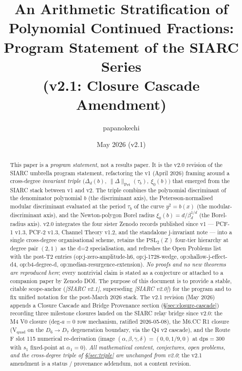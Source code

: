 \documentclass[11pt,a4paper]{article}
\title{An Arithmetic Stratification of Polynomial Continued Fractions:\\
       Program Statement of the SIARC Series\\
       \large (v2.1: Closure Cascade Amendment)}
\author{papanokechi}
\date{May 2026 (v2.1)}
\theoremstyle{definition}
\theoremstyle{remark}
\newcommand{\PSLZ}{\mathrm{PSL}_2(\mathbb{Z})}
\newcommand{\PetN}[1]{\lVert #1 \rVert_{\mathrm{Pet}}}
\begin{document}
\maketitle

\begin{abstract}
This paper is a \emph{program statement}, not a results paper. It is the
v2.0 revision of the SIARC umbrella program statement, refactoring the
v1 (April 2026) framing around a cross-degree \emph{invariant triple}
\(\bigl(\Delta_d(b),\ \PetN{\Delta}(\tau_b),\ \xi_0(b)\bigr)\) that
emerged from the SIARC stack between v1 and v2. The triple combines
the polynomial discriminant of the denominator polynomial \(b\) (the
discriminant axis), the Petersson-normalised modular discriminant
evaluated at the period \(\tau_b\) of the curve \(y^2 = b(x)\) (the
modular-discriminant axis), and the Newton-polygon Borel radius
\(\xi_0(b) = d/\beta_d^{1/d}\) (the Borel-radius axis). v2.0 integrates
the four sister Zenodo records published since v1 --- PCF-1 v1.3,
PCF-2 v1.3, Channel Theory v1.2, and the standalone j-invariant
note --- into a single cross-degree organisational scheme, retains the
$\PSLZ$ four-tier hierarchy at degree pair \((2,1)\) as the d=2
specialisation, and refreshes the Open Problems list with the
post-T2 entries (\textsf{op:j-zero-amplitude-h6},
\textsf{op:j-1728-wedge}, \textsf{op:shallow-j-effect-d4},
\textsf{op:b4-degree-d}, \textsf{op:median-resurgence-extension}).
\emph{No proofs and no new theorems are reproduced here}; every
nontrivial claim is stated as a conjecture or attached to a companion
paper by Zenodo DOI. The purpose of this document is to provide a
stable, citable scope-anchor (\emph{[SIARC v2.1]}, superseding
\emph{[SIARC v2.0]}) for the program and to fix unified notation for
the post-March 2026 stack. The v2.1 revision (May 2026) appends a
Closure Cascade and Bridge Provenance section
(\S\ref{sec:closure-cascade}) recording three milestone closures landed
on the SIARC relay bridge since v2.0: the M4 V0 closure (deg-$a=0$ row
mechanism, ratified 2026-05-08), the M6.CC R1 closure (V$_{\mathrm{quad}}$
on the $D_6 \to D_7$ degeneration boundary, via the Q4 v2 cascade), and
the Route F slot 115 numerical re-derivation (image
$(\alpha,\beta,\gamma,\delta) = (0,0,1/9,0)$ at $\mathrm{dps}=300$ with
$s_1$ fixed-point at $\alpha_1 = 0$). \emph{All mathematical content,
conjectures, open problems, and the cross-degree triple of
\S\ref{sec:triple} are unchanged from v2.0}; the v2.1 amendment is a
status / provenance addendum, not a content revision.
\end{abstract}
\end{document}
